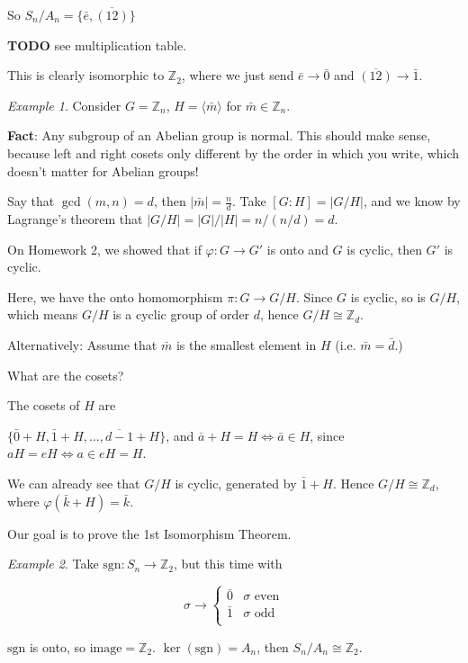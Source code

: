\documentclass[12pt]{article}
\def\sgn{\text{sgn}}
\def\phi{\varphi}
\def\sgn{\text{sgn}}
\def\image{\text{image}}
\def\Z{{\mathbb Z}}
\def\TODO{\color{red}\textbf{TODO}\color{black}}
\newcommand{\lr}[1]{\langle #1 \rangle}
\theoremstyle{remark}
\theoremstyle{remark}
\theoremstyle{remark}
\newtheorem{example}{Example}
\theoremstyle{remark}
\theoremstyle{remark}
\begin{document}
So $S_n / A_n = \{ \bar e, \overline{(12)} \}$

\TODO{} see multiplication table.

This is clearly isomorphic to $\Z_2$, where we just send $\bar e \to \bar 0$ and
$\overline{(12)} \to \bar 1$.

\begin{example}
  Consider $G = \Z_n$, $H = \lr{\bar m}$ for $\bar m \in \Z_n$.

  {\bf Fact}: Any subgroup of an Abelian group is normal. This should make
  sense, because left and right cosets only different by the order in which you
  write, which doesn't matter for Abelian groups!

  Say that $\gcd(m, n) = d$, then $|\bar m| = \frac{n}{d}$. Take $[G : H] = |G /
  H|$, and we know by Lagrange's theorem that $|G / H| = |G| / |H| = n / (n / d)
  = d$.

  On Homework 2, we showed that if $\phi: G \to G'$ is onto and $G$ is cyclic,
  then $G'$ is cyclic.

  Here, we have the onto homomorphism $\pi: G \to G / H$. Since $G$ is cyclic,
  so is $G / H$, which means $G / H$ is a cyclic group of order $d$, hence $G /
  H \cong \Z_d$.
\end{example}

Alternatively: Assume that $\bar m$ is the smallest element in $H$ (i.e. $\bar m
= \bar d$.)

What are the cosets?

The cosets of $H$ are

$\{\bar 0 + H, \bar 1 + H, \dots, \overline{d - 1} + H\}$, and $\bar a + H = H
\Leftrightarrow \bar a \in H$, since $aH = eH \Leftrightarrow a \in eH = H$.

We can already see that $G / H$ is cyclic, generated by $\bar 1 + H$. Hence $G /
H \cong \Z_d$, where $\phi(\bar k + H) = \bar k$.

Our goal is to prove the 1st Isomorphism Theorem.

\begin{example}
  Take $\sgn: S_n \to \Z_2$, but this time with

  \[
    \sigma \to \begin{cases}
      \bar 0 & \sigma \text{ even} \\
      \bar 1 & \sigma \text{ odd} \\
    \end{cases}
  \]

  $\sgn$ is onto, so $\image = \Z_2$. $\ker(\sgn) = A_n$, then $S_n / A_n \cong
  \Z_2$.
\end{example}
\end{document}
